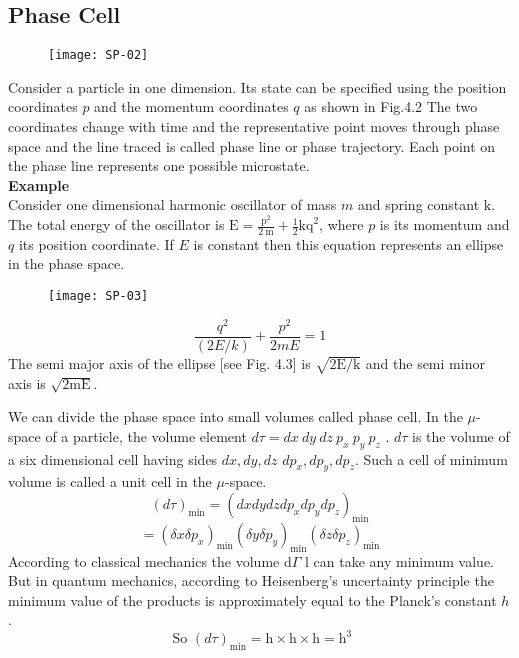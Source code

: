 \subsection{Phase Cell}
\begin{figure}[H]
	\centering
	\texttt{[image: SP-02]}
\end{figure}
\par Consider a particle in one dimension. Its state can be specified using the position coordinates $p$ and the momentum coordinates $q$ as shown in Fig.4.2 The two coordinates change with time and the representative point moves through phase space and the line traced is called phase line or phase trajectory. Each point on the phase line represents one possible microstate.\\
\textbf{Example}\\
Consider one dimensional harmonic oscillator of mass $m$ and spring constant $\mathrm{k}$. The total energy of the oscillator is $\mathrm{E}=\frac{\mathrm{p}^{2}}{2 \mathrm{~m}}+\frac{1}{2} \mathrm{kq}^{2}$, where $p$ is its momentum and $q$ its position coordinate. If $E$ is constant then this equation represents an ellipse in the phase space.
\begin{figure}[H]
	\centering
	\texttt{[image: SP-03]}
\end{figure}
$$\frac{q^{2}}{(2 E / k)}+\frac{p^{2}}{2 m E}=1$$
The semi major axis of the ellipse [see Fig. 4.3] is $\sqrt{2 \mathrm{E} / \mathrm{k}}$ and the semi minor axis is $\sqrt{2 \mathrm{mE}}$.\\
\par We can divide the phase space into small volumes called phase cell. In the $\mu$-space of a particle, the volume element $d \tau=d x\  d y \ d z\  p_{x}\  p_y \ p_z$ . $d\tau$  is the volume of a six dimensional cell having sides ${d x, d y, d z}$ $d p_{x}, d p_{y}, d p_{z}$. Such a cell of minimum volume is called a unit cell in the $\mu$-space.
$$(d \tau)_{\min }=\left(d x d y d z d p_{x} d p_{y} d p_{z}\right)_{\min }$$
$$=\left(\delta x \delta p_{x}\right)_{\min }\left(\delta y \delta p_{y}\right)_{\min }\left(\delta z \delta p_{z}\right)_{\min }$$
According to classical mechanics the volume d$\Gamma$
 l can take any minimum value. But in quantum mechanics, according to Heisenberg's uncertainty principle the minimum value of the products is approximately equal to the Planck's constant $h$.\\
$$\text{ So }(d \tau)_{\min }=\mathrm{h} \times \mathrm{h} \times \mathrm{h}=\mathrm{h}^{3}$$
